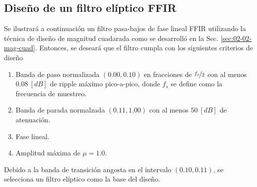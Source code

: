 \message{ !name(../main.tex)}\documentclass[journal,transmag]{IEEEtran}
\begin{document}
\subsection{Diseño de un filtro elíptico FFIR}
    Se ilustrará a continuación un filtro pasa-bajos de fase lineal FFIR utilizando la técnica de diseño de magnitud cuadarada como se desarrolló en la Sec. \ref{sec:02-02-mag-cuad}. Entonces, se deseará que el filtro cumpla con los siguientes criterios de diseño

    \begin{enumerate}
      \item Banda de paso normalizada $(0.00,0.10)$ en fracciones de $\nicefrac{f_{s}}{2}$ con al menos $0.08 \: [\unit{dB}]$ de ripple máximo pico-a-pico, donde $f_{s}$ se define como la frecuencia de muestreo.
      \item Banda de parada normalzada $(0.11,1.00)$ con al menos $50 \: [\unit{dB}]$ de atenuación.
      \item Fase lineal.
      \item Amplitud máxima de $\mu = 1.0$.
    \end{enumerate}

    Debido a la banda de transición angosta en el intervalo $(0.10,0.11)$, se selecciona un filtro elíptico como la base del diseño.




\end{document}
